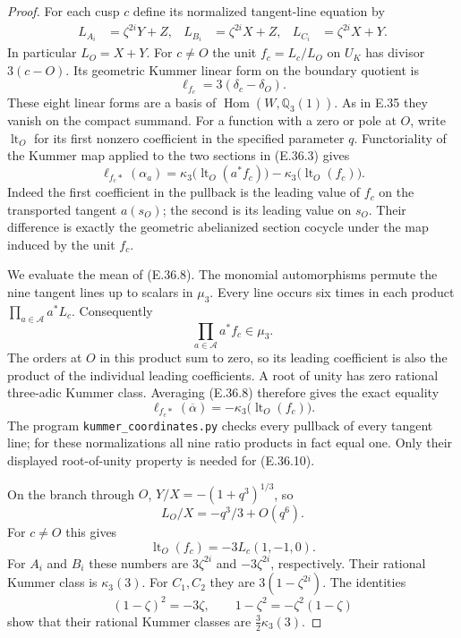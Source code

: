 \documentclass[11pt,oneside]{article}
\begin{document}
\begin{proof}
For each cusp $c$ define its normalized
tangent-line equation by
\[
 \begin{aligned}
 L_{A_i}&=\zeta^{2i}Y+Z,&
 L_{B_i}&=\zeta^{2i}X+Z,&
 L_{C_i}&=\zeta^{2i}X+Y.
 \end{aligned}
\]
In particular $L_O=X+Y$. For $c\ne O$ the
unit $f_c=L_c/L_O$ on $U_K$ has divisor
$3(c-O)$. Its geometric Kummer linear form
on the boundary quotient is
\[
                   \ell_{f_c}=3(\delta_c-\delta_O).
 \tag{E.36.7}
\]
These eight linear forms are a basis of
$\operatorname{Hom}(W,\mathbb Q_3(1))$.
As in E.35 they vanish on the compact
summand. For a function with a zero or
pole at $O$, write $\operatorname{lt}_O$
for its first nonzero coefficient in the
specified parameter $q$.
Functoriality of the Kummer map applied to
the two sections in (E.36.3) gives
\[
 \ell_{f_c*}(\alpha_a)=
     \kappa_3\bigl(\operatorname{lt}_O(a^*f_c)\bigr)
       -\kappa_3\bigl(\operatorname{lt}_O(f_c)\bigr).
 \tag{E.36.8}
\]
Indeed the first coefficient in the
pullback is the leading value of $f_c$
on the transported tangent $a(s_O)$;
the second is its leading value on $s_O$.
Their difference is exactly the geometric
abelianized section cocycle under the
map induced by the unit $f_c$.

We evaluate the mean of (E.36.8).
The monomial automorphisms permute the nine
tangent lines up to scalars in $\mu_3$.
Every line occurs six times in each
product $\prod_{a\in\mathcal A}a^*L_c$.
Consequently
\[
       \prod_{a\in\mathcal A}a^*f_c\in\mu_3.
 \tag{E.36.9}
\]
The orders at $O$ in this product sum to
zero, so its leading coefficient is also
the product of the individual leading
coefficients. A root of unity has zero
rational three-adic Kummer class. Averaging
(E.36.8) therefore gives the exact equality
\[
 \ell_{f_c*}(\overline\alpha)
      =-\kappa_3\bigl(\operatorname{lt}_O(f_c)\bigr).
 \tag{E.36.10}
\]
The program \texttt{kummer\_coordinates.py}
checks every pullback of every tangent
line; for these normalizations all nine
ratio products in fact equal one. Only
their displayed root-of-unity property
is needed for (E.36.10).

On the branch through $O$,
$Y/X=-(1+q^3)^{1/3}$, so
\[
             L_O/X=-q^3/3+O(q^6).
\]
For $c\ne O$ this gives
\[
 \operatorname{lt}_O(f_c)=-3L_c(1,-1,0).
 \tag{E.36.11}
\]
For $A_i$ and $B_i$ these numbers are
$3\zeta^{2i}$ and $-3\zeta^{2i}$,
respectively. Their rational Kummer class
is $\kappa_3(3)$. For $C_1,C_2$ they are
$3(1-\zeta^{2i})$. The identities
\[
 (1-\zeta)^2=-3\zeta,\qquad
 1-\zeta^2=-\zeta^2(1-\zeta)
\]
show that their rational Kummer classes
are $\tfrac32\kappa_3(3)$.


\end{proof}
\end{document}
